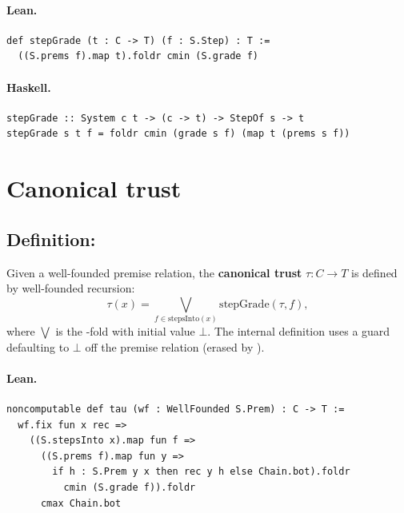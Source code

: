 \documentclass[11pt,a4paper]{article}
\begin{document}
\paragraph{Lean.}
\begin{lstlisting}[style=lean]
def stepGrade (t : C -> T) (f : S.Step) : T :=
  ((S.prems f).map t).foldr cmin (S.grade f)
\end{lstlisting}

\paragraph{Haskell.}
\begin{lstlisting}[style=haskell]
stepGrade :: System c t -> (c -> t) -> StepOf s -> t
stepGrade s t f = foldr cmin (grade s f) (map t (prems s f))
\end{lstlisting}

\section{Canonical trust}

\subsection{Definition: }

\begin{defn}
Given a well-founded premise relation, the \textbf{canonical trust}
$\tau : C \to T$ is defined by well-founded recursion:
\[
  \tau(x) = \bigvee_{f \in \mathrm{stepsInto}(x)} \mathrm{stepGrade}(\tau, f),
\]
where $\bigvee$ is the -fold with initial value $\bot$.
The internal definition uses a  guard defaulting to $\bot$ off the
premise relation (erased by ).
\end{defn}

\paragraph{Lean.}
\begin{lstlisting}[style=lean]
noncomputable def tau (wf : WellFounded S.Prem) : C -> T :=
  wf.fix fun x rec =>
    ((S.stepsInto x).map fun f =>
      ((S.prems f).map fun y =>
        if h : S.Prem y x then rec y h else Chain.bot).foldr
          cmin (S.grade f)).foldr
      cmax Chain.bot
\end{lstlisting}
\end{document}
